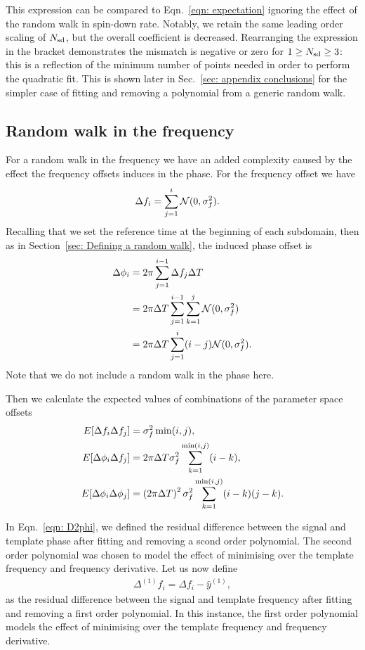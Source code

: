 This expression can be compared to Eqn.~\eqref{eqn: expectation} ignoring the
effect of the random walk in spin-down rate. Notably, we retain the same
leading order scaling of $N_{\textrm{sd}}$, but the overall coefficient is decreased.
Rearranging the expression in the bracket demonstrates the mismatch is negative
or zero for $1 \ge N_{\textrm{sd}} \ge 3$: this is a reflection of the minimum number of
points needed in order to perform the quadratic fit. This is shown later in
Sec.~\ref{sec: appendix conclusions} for the simpler case of fitting and
removing a polynomial from a generic random walk.

\subsection{Random walk in the frequency}

For a random walk in the frequency we have an added complexity caused by the
effect the frequency offsets induces in the phase. For the frequency offset we
have
\begin{align}
\Delta f_{i} &= \sum_{j=1}^{i}\mathcal{N}(0, \sigma_{f}^{2}).
\end{align}
Recalling that we set the reference time at the beginning of each subdomain,
then as in Section~\ref{sec: Defining a random walk}, the induced phase offset is
\begin{align}
\Delta\phi_{i} &=2\pi \sum_{j=1}^{i-1}\Delta f_{j}\Delta T \\
 & = 2\pi\Delta T \sum_{j=1}^{i-1}\sum_{k=1}^{j}\mathcal{N}(0, \sigma_{f}^{2}) \\
& = 2\pi\Delta T \sum_{j=1}^{i}(i-j)\mathcal{N}(0, \sigma_{f}^{2}).
\label{eqn: P2F}
\end{align}
Note that we do not include a random walk in the phase here.

Then we calculate the expected values of combinations of the parameter space
offsets
\begin{align}
E[\Delta f_{i}\Delta f_{j}] & = \sigma_{f}^{2} \min(i, j), \label{eqn: E1} \\
E[\Delta\phi_{i}\Delta f_{j}] & = 2 \pi \Delta T \sigma_{f}^{2} \sum_{k=1}^{\min(i, j)}(i-k), \label{eqn: E2}\\
E[\Delta\phi_{i}\Delta\phi_{j}] & =
\left(2\pi\Delta T\right)^{2}\sigma_{f}^{2} \sum_{k=1}^{\min(i, j)}(i-k)(j-k).
\label{eqn: E3}
\end{align}

In Eqn.~\eqref{eqn: D2phi}, we defined the residual difference between the signal
and template phase after fitting and removing a scond order polynomial. The
second order polynomial was chosen to model the effect of minimising over the
template frequency and frequency derivative. Let us now define
\begin{align}
\Delta^{(1)}f_i = \Delta f_i - \hat{y}^{(1)},
\label{eqn: D2f}
\end{align}
as the residual difference between the signal and template frequency after
fitting and removing a first order polynomial. In this instance, the first
order polynomial models the effect of minimising over the template
frequency and frequency derivative.

